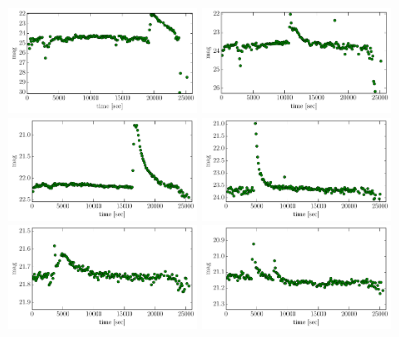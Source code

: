\documentclass[iop, apj]{emulateapj}
\newcommand{\?}{\stackrel{?}{=}}
\begin{document}
\clearpage
\begin{figure}[h]
\centering
\includegraphics[width=5cm,clip,angle=90]{pic/flare/cand_1.pdf}
\includegraphics[width=5cm,clip,angle=90]{pic/flare/cand_2.pdf}
\includegraphics[width=5cm,clip,angle=90]{pic/flare/cand_3.pdf}
\includegraphics[width=5cm,clip,angle=90]{pic/flare/cand_4.pdf}
\includegraphics[width=5cm,clip,angle=90]{pic/flare/cand_5.pdf}
\includegraphics[width=5cm,clip,angle=90]{pic/flare/cand_6.pdf}

\end{figure}
\end{document}
